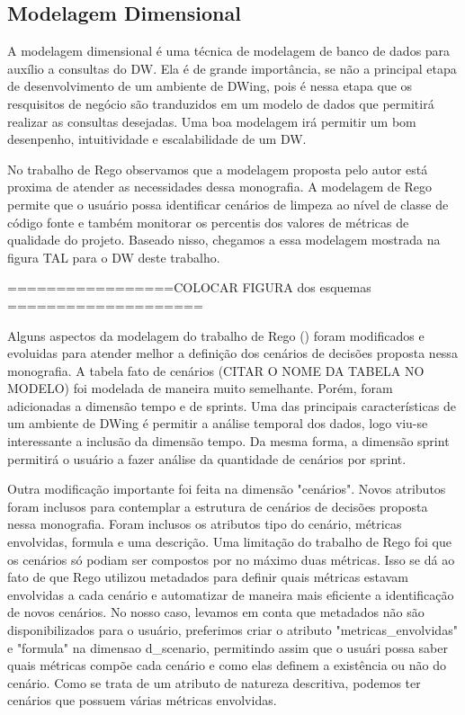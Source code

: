 \subsection{Modelagem Dimensional}

A modelagem dimensional é uma técnica de modelagem de banco de dados para auxílio a consultas do DW. Ela é de grande importância, se não a principal etapa de desenvolvimento de um ambiente de DWing, pois é nessa etapa que os resquisitos de negócio são tranduzidos em um modelo de dados que permitirá realizar as consultas desejadas. Uma boa modelagem irá permitir um bom desenpenho, intuitividade e escalabilidade de um DW.


No trabalho de Rego \citeyear{rego2014} observamos que a modelagem proposta pelo autor está proxima de atender as necessidades dessa monografia. A modelagem de Rego \citeyear{rego2014} permite que o usuário possa identificar cenários de limpeza ao nível de classe de código fonte e também monitorar os percentis dos valores de métricas de qualidade do projeto. Baseado nisso, chegamos a essa modelagem mostrada na figura TAL para o DW deste trabalho.

=================COLOCAR FIGURA dos esquemas ====================


Alguns aspectos da modelagem do trabalho de Rego (\citeyear{rego2014}) foram modificados e evoluidas para atender melhor a definição dos cenários de decisões proposta nessa monografia. A tabela fato de cenários  (CITAR O NOME DA TABELA NO MODELO)  foi modelada de maneira muito semelhante. Porém, foram adicionadas a dimensão tempo e de sprints. Uma das principais características de um ambiente de DWing é permitir a análise temporal dos dados, logo viu-se interessante a inclusão da dimensão tempo. Da mesma forma, a dimensão sprint permitirá o usuário a fazer análise da quantidade de cenários por sprint. 

Outra modificação importante foi feita na dimensão "cenários". Novos atributos foram inclusos para contemplar a estrutura de cenários de decisões proposta nessa monografia. Foram inclusos os atributos tipo do cenário, métricas envolvidas, formula e uma descrição. Uma limitação do trabalho de Rego foi que os cenários só podiam ser compostos por no máximo duas métricas. Isso se dá ao fato de que Rego utilizou  metadados para definir quais métricas estavam envolvidas a cada cenário e automatizar de maneira mais eficiente a identificação de novos cenários. No nosso caso, levamos em conta que  metadados não são disponibilizados para o usuário, preferimos criar o atributo "metricas\_envolvidas" e "formula" na dimensao d\_scenario, permitindo assim que o usuári possa saber quais métricas compõe cada cenário e como elas definem a existência ou não do cenário. Como se trata de um atributo de natureza descritiva, podemos ter cenários que possuem várias métricas envolvidas.


